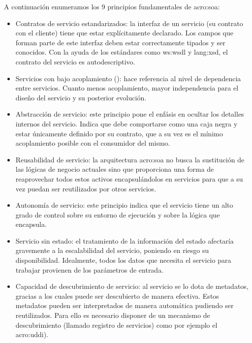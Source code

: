A continuación enumeramos los 9 principios fundamentales de \gls{acro:soa}:

\begin{itemize}
  \item Contratos de servicio estandarizados: la interfaz de un servicio (su contrato con el cliente) tiene que estar explícitamente declarado. Los campos  que forman parte de este interfaz deben estar correctamente tipados y ser conocidos. Con la ayuda de los estándares como \gls{ws:wsdl} y \gls{lang:xsd}, el contrato del servicio es autodescriptivo.

  \item Servicios con bajo acoplamiento (): hace referencia al nivel de dependencia entre servicios. Cuanto menos acoplamiento, mayor independencia para el diseño del servicio y su posterior evolución.

  \item Abstracción de servicio: este principio pone el enfásis en ocultar los detalles internos del servicio. Indica que debe comportarse como una caja negra y estar únicamente definido por su contrato, que a su vez es el mínimo acoplamiento posible con el consumidor del mismo.

  \item Reusabilidad de servicio: la arquitectura \gls{acro:soa} no busca la sustitución de las lógicas de negocio actuales sino que proporciona una forma de reaprovechar todos estos activos encapsulándolos en servicios para que a su vez puedan ser reutilizados por otros servicios.

  \item Autonomía de servicio: este principio indica que el servicio tiene un alto grado de control sobre su entorno de ejecución y sobre la lógica que encapsula.

  \item Servicio sin estado: el tratamiento de la información del estado afectaría gravemente a la escalabilidad del servicio, poniendo en riesgo su disponibilidad. Idealmente, todos los datos que necesita el servicio para trabajar provienen de los parámetros de entrada.

  \item Capacidad de descubrimiento de servicio: al servicio se lo dota de metadatos, gracias a los cuales puede ser descubierto de manera efectiva. Estos metadatos pueden ser interpretados de manera automática pudiendo ser reutilizados. Para ello es necesario disponer de un mecanismo de descubrimiento (llamado registro de servicios) como por ejemplo el \gls{acro:uddi}).


\end{itemize}
